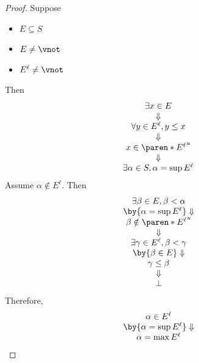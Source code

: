 \begin{proof}
  Suppose
  \begin{itemize}
    \item $E \subseteq S$
    \item $E \neq \vnot$
    \item $E^{\ell} \neq \vnot$
  \end{itemize}
  Then
  \[
    \begin{array}{c}
      \exists x \in E                  \\
      \Downarrow                       \\
      \forall y \in E^{\ell}, y \leq x \\
      \Downarrow                       \\
      x \in \paren*{E^{\ell}}^{u}      \\
      \Downarrow                       \\
      \exists \alpha \in S, \alpha = \sup E^{\ell}
    \end{array}
  \]
  Assume $\alpha \notin E^{\ell}$. Then
  \[
    \begin{array}{c}
      \exists \beta \in E, \beta < \alpha                 \\
      \by{\ensuremath{\alpha = \sup E^{\ell}}} \Downarrow \\
      \beta \notin \paren*{E^{\ell}}^{u}                  \\
      \Downarrow                                          \\
      \exists \gamma \in E^{\ell}, \beta < \gamma         \\
      \by{\ensuremath{\beta \in E}} \Downarrow            \\
      \gamma \leq \beta                                   \\
      \Downarrow                                          \\
      \bot
    \end{array}
  \]
  Therefore,
  \[
    \begin{array}{c}
      \alpha \in E^{\ell}                                 \\
      \by{\ensuremath{\alpha = \sup E^{\ell}}} \Downarrow \\
      \alpha = \max E^{\ell}
    \end{array}
  \]
\end{proof}
